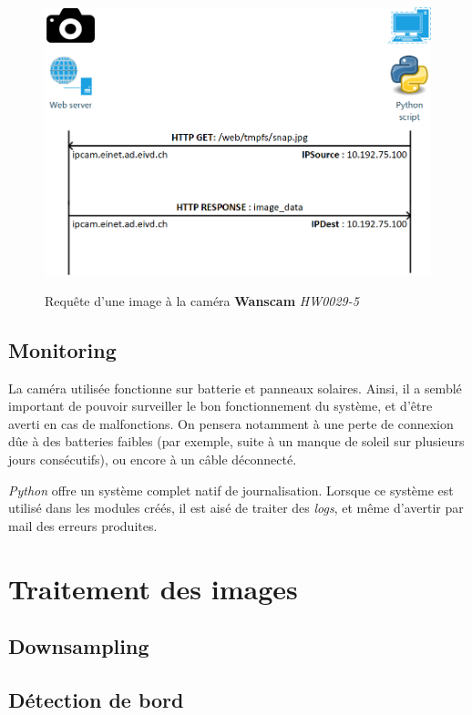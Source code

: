 \begin{figure}[H]
    \includegraphics[width=130mm]{img/realisation/cam_request.png}
    \label{fig:image_request}
    \centering
    \caption{Requête d'une image à la caméra \textbf{Wanscam} \textit{HW0029-5}}
\end{figure} 

\subsection{Monitoring}
La caméra utilisée fonctionne sur batterie et panneaux solaires. Ainsi, il a semblé important de pouvoir surveiller le bon fonctionnement du système, et d'être averti en cas de malfonctions. On pensera notamment à une perte de connexion dûe à des batteries faibles (par exemple, suite à un manque de soleil sur plusieurs jours consécutifs), ou encore à un câble déconnecté.

\textit{Python} offre un système complet natif de journalisation. Lorsque ce système est utilisé dans les modules créés, il est aisé de traiter des \textit{logs}, et même d'avertir par mail des erreurs produites.


\section{Traitement des images}
\subsection{Downsampling}
\subsection{Détection de bord}
